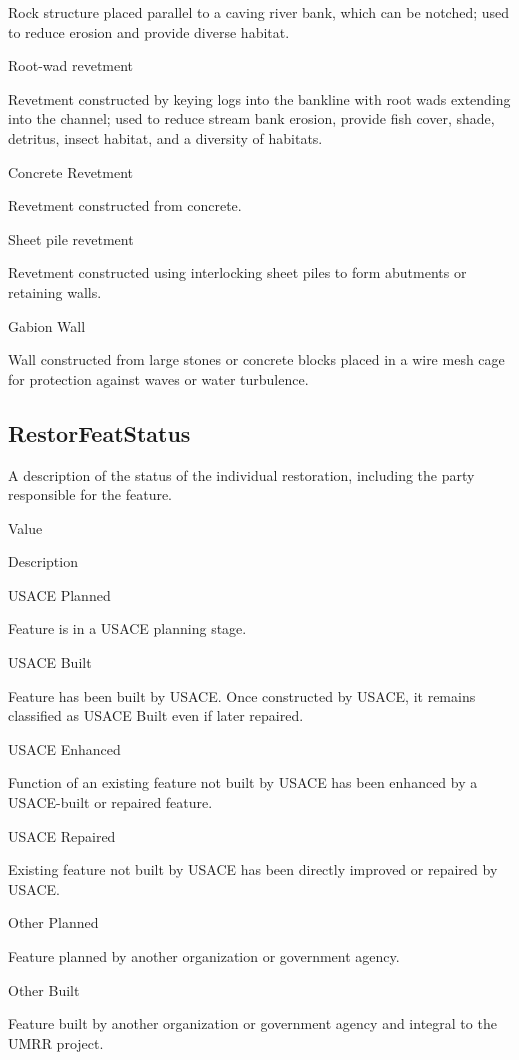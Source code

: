 \documentclass[
  letterpaper,
  DIV=11,
  numbers=noendperiod]{scrreprt}
\begin{document}
Rock structure placed parallel to a caving river bank, which can be
notched; used to reduce erosion and provide diverse habitat.

Root-wad revetment

Revetment constructed by keying logs into the bankline with root wads
extending into the channel; used to reduce stream bank erosion, provide
fish cover, shade, detritus, insect habitat, and a diversity of
habitats.

Concrete Revetment

Revetment constructed from concrete.

Sheet pile revetment

Revetment constructed using interlocking sheet piles to form abutments
or retaining walls.

Gabion Wall

Wall constructed from large stones or concrete blocks placed in a wire
mesh cage for protection against waves or water turbulence.

\subsection{RestorFeatStatus}\label{restorfeatstatus-11}

A description of the status of the individual restoration, including the
party responsible for the feature.

Value

Description

USACE Planned

Feature is in a USACE planning stage.

USACE Built

Feature has been built by USACE. Once constructed by USACE, it remains
classified as USACE Built even if later repaired.

USACE Enhanced

Function of an existing feature not built by USACE has been enhanced by
a USACE-built or repaired feature.

USACE Repaired

Existing feature not built by USACE has been directly improved or
repaired by USACE.

Other Planned

Feature planned by another organization or government agency.

Other Built

Feature built by another organization or government agency and integral
to the UMRR project.
\end{document}
